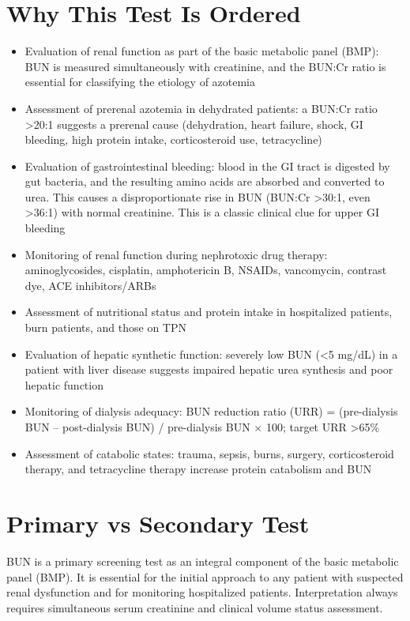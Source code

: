 \section*{Why This Test Is Ordered}
\begin{itemize}
  \item Evaluation of renal function as part of the basic metabolic panel (BMP): BUN is measured simultaneously with creatinine, and the BUN:Cr ratio is essential for classifying the etiology of azotemia
  \item Assessment of prerenal azotemia in dehydrated patients: a BUN:Cr ratio >20:1 suggests a prerenal cause (dehydration, heart failure, shock, GI bleeding, high protein intake, corticosteroid use, tetracycline)
  \item Evaluation of gastrointestinal bleeding: blood in the GI tract is digested by gut bacteria, and the resulting amino acids are absorbed and converted to urea. This causes a disproportionate rise in BUN (BUN:Cr >30:1, even >36:1) with normal creatinine. This is a classic clinical clue for upper GI bleeding
  \item Monitoring of renal function during nephrotoxic drug therapy: aminoglycosides, cisplatin, amphotericin B, NSAIDs, vancomycin, contrast dye, ACE inhibitors/ARBs
  \item Assessment of nutritional status and protein intake in hospitalized patients, burn patients, and those on TPN
  \item Evaluation of hepatic synthetic function: severely low BUN (<5 mg/dL) in a patient with liver disease suggests impaired hepatic urea synthesis and poor hepatic function
  \item Monitoring of dialysis adequacy: BUN reduction ratio (URR) = (pre-dialysis BUN -- post-dialysis BUN) / pre-dialysis BUN $\times$ 100; target URR >65\%
  \item Assessment of catabolic states: trauma, sepsis, burns, surgery, corticosteroid therapy, and tetracycline therapy increase protein catabolism and BUN
\end{itemize}

\section*{Primary vs Secondary Test}
BUN is a primary screening test as an integral component of the basic metabolic panel (BMP). It is essential for the initial approach to any patient with suspected renal dysfunction and for monitoring hospitalized patients. Interpretation always requires simultaneous serum creatinine and clinical volume status assessment.

